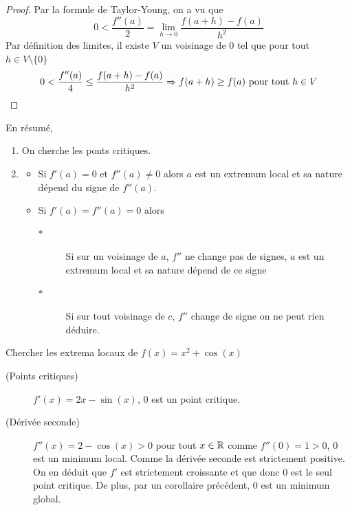 \begin{proof}
    Par la formule de Taylor-Young, on a vu que 
    \begin{equation*}
        0<\frac{f''(a)}{2}=\lim_{h\to 0}\frac{f(a+h)-f(a)}{h^2}
    \end{equation*}
    Par définition des limites, il existe $V$ un voisinage de $0$ tel que pour tout $h\in V\setminus\{0\}$
    \begin{equation*}
        0<\frac{f''(a)}{4}\leq \frac{f(a+h)-f(a)}{h^2}\Rightarrow f(a+h)\ge f(a)\text{ pour tout $h\in V$}
    \end{equation*}
\end{proof}
En résumé,\begin{enumerate}
    \item On cherche les ponts critiques.
     \item \begin{itemize}
         \item Si $f'(a) = 0$ et $f''(a)\ne 0$ alors $a$ est un extremum local et sa nature dépend du signe de $f''(a)$.
         \item Si $f'(a) = f''(a) = 0$ alors 
         \begin{description}
             \item[$*$ ] Si sur un voisinage de $a$, $f''$ ne change pas de signes, $a$ est un extremum local et sa nature dépend de ce signe
             \item[$*$ ] Si sur tout voisinage de $c$, $f''$ change de signe on ne peut rien déduire.
         \end{description}
     \end{itemize}
\end{enumerate}
\begin{exemple}
    Chercher les extrema locaux de $f(x) = x^2 + \cos(x)$
    \begin{description}
        \item[(Points critiques)] $f'(x)=2x-\sin(x)$, $0$ est un point critique. 
        \item[(Dérivée seconde)] $f''(x)=2-\cos(x)>0$ pour tout $x\in \mathbb{R}$ comme $f''(0)=1>0$, $0$ est un minimum local. Comme la dérivée seconde est strictement positive. On en déduit que $f'$ est strictement croissante et que donc $0$ est le seul point critique. De plus, par un corollaire précédent, $0$ est un minimum global.
    \end{description}
    
\end{exemple}
